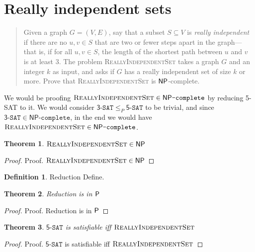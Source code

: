 
\newtheorem{theorem}{Theorem}
\theoremstyle{definition}
\newtheorem{definition}{Definition}[section]


\maketitle
\thispagestyle{firststyle}
\vspace{-2.0cm}

\newcommand{\RIS}{\textsc{ReallyIndependentSet}}
\newcommand{\NPC}{\mathsf{NP}\texttt{-complete}}
\newcommand{\fSAT}{\mathsf{5}\texttt{-SAT}}
\newcommand{\tSAT}{\mathsf{3}\texttt{-SAT}}

\section{Really independent sets}
    \begin{quote}
    Given a graph $G = (V,E)$, say that a subset $S \subseteq V$ is \emph{really independent} if there are no $u,v \in S$ that are two or fewer steps apart in the graph---that is, if for all $u,v \in S$, the length of the shortest path
    between $u$ and $v$ is at least 3.
    The problem \textsc{ReallyIndependentSet} takes a graph $G$ and an integer $k$ as input, and asks if $G$ has a really independent set of size $k$ or more.
    Prove that \textsc{ReallyIndependentSet} is $\NP$-complete.
    \end{quote}

We would be proofing $\RIS \in \NPC$ by reducing 5-SAT to it. 
We would consider $\tSAT \le_P \fSAT$ to be trivial, and since $\tSAT \in \NPC$, in the end we would have $\RIS \in \NPC$.

\begin{theorem}
    $\RIS \in \NP $
\end{theorem}

\begin{proof}
    Proof. $\RIS \in \NP $
\end{proof}

\theoremstyle{definition}
\begin{definition}{Reduction}
    Define.

\end{definition}

\begin{theorem}
    Reduction is in $\P$
\end{theorem}

\begin{proof}
    Proof. Reduction is in $\P$
\end{proof}

\begin{theorem}
    $\fSAT$ is satisfiable iff $\RIS$
\end{theorem}

\begin{proof}
    Proof. $\fSAT$ is satisfiable iff $\RIS$
\end{proof}


